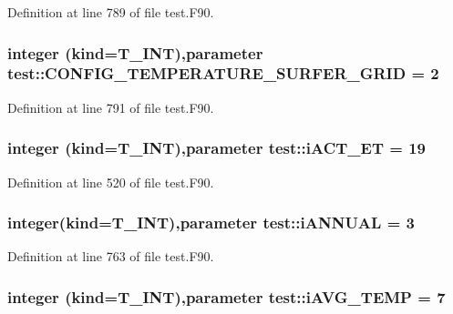 Definition at line 789 of file test.F90.

\hypertarget{namespacetest_a474c230f779edba10f9928cfc29d3a9b}{
\subsubsection[{CONFIG\_\-TEMPERATURE\_\-SURFER\_\-GRID}]{\setlength{\rightskip}{0pt plus 5cm}integer (kind={\bf T\_\-INT}),parameter {\bf test::CONFIG\_\-TEMPERATURE\_\-SURFER\_\-GRID} = 2}}
\label{namespacetest_a474c230f779edba10f9928cfc29d3a9b}


Definition at line 791 of file test.F90.

\hypertarget{namespacetest_a76800e5ee56fa8c6e4612e43dc56cb8b}{
\subsubsection[{iACT\_\-ET}]{\setlength{\rightskip}{0pt plus 5cm}integer (kind={\bf T\_\-INT}),parameter {\bf test::iACT\_\-ET} = 19}}
\label{namespacetest_a76800e5ee56fa8c6e4612e43dc56cb8b}


Definition at line 520 of file test.F90.

\hypertarget{namespacetest_a952527c86ef64f1bf77dc314ac43c14e}{
\subsubsection[{iANNUAL}]{\setlength{\rightskip}{0pt plus 5cm}integer(kind={\bf T\_\-INT}),parameter {\bf test::iANNUAL} = 3}}
\label{namespacetest_a952527c86ef64f1bf77dc314ac43c14e}


Definition at line 763 of file test.F90.

\hypertarget{namespacetest_a9b67c0e46fcbed22fc39728c65d345f9}{
\subsubsection[{iAVG\_\-TEMP}]{\setlength{\rightskip}{0pt plus 5cm}integer (kind={\bf T\_\-INT}),parameter {\bf test::iAVG\_\-TEMP} = 7}}
\label{namespacetest_a9b67c0e46fcbed22fc39728c65d345f9}


